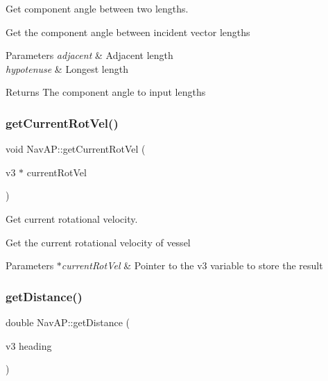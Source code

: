 Get component angle between two lengths. 

Get the component angle between incident vector lengths 
\begin{DoxyParams}{Parameters}
{\em adjacent} & Adjacent length \\
\hline
{\em hypotenuse} & Longest length \\
\hline
\end{DoxyParams}
\begin{DoxyReturn}{Returns}
The component angle to input lengths 
\end{DoxyReturn}
\mbox{\label{classNavAP_aa0e617c2a5b253b3eeaead6efc15b0a9}} 
\subsubsection{\texorpdfstring{get\+Current\+Rot\+Vel()}{getCurrentRotVel()}}
{\footnotesize\ttfamily void Nav\+A\+P\+::get\+Current\+Rot\+Vel (\begin{DoxyParamCaption}\item[{v3 $\ast$}]{current\+Rot\+Vel }\end{DoxyParamCaption})\hspace{0.3cm}{\ttfamily [private]}}



Get current rotational velocity. 

Get the current rotational velocity of vessel 
\begin{DoxyParams}{Parameters}
{\em $\ast$current\+Rot\+Vel} & Pointer to the v3 variable to store the result \\
\hline
\end{DoxyParams}
\mbox{\label{classNavAP_a1b215919d2892861653411bdfd9c0737}} 
\subsubsection{\texorpdfstring{get\+Distance()}{getDistance()}}
{\footnotesize\ttfamily double Nav\+A\+P\+::get\+Distance (\begin{DoxyParamCaption}\item[{v3}]{heading }\end{DoxyParamCaption})\hspace{0.3cm}{\ttfamily [private]}}



